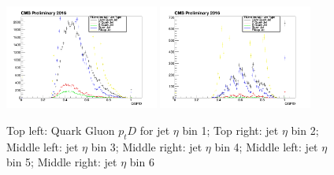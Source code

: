 \begin{figure}[htbp]
\begin{center}
  \includegraphics[width=0.45\textwidth]{sections/mc4/TopTagger/figures/_b_qgptdjetetabin4_.png}
  \includegraphics[width=0.45\textwidth]{sections/mc4/TopTagger/figures/_b_qgptdjetetabin5_.png}
 \end{center}
 \caption{Top left: Quark Gluon $p_{t}D$ for jet $\eta$ bin 1; Top right: jet $\eta$ bin 2; Middle left: jet $\eta$ bin 3; Middle right: jet $\eta$ bin 4; Middle left: jet $\eta$ bin 5; Middle right: jet $\eta$ bin 6}
 \label{fig:c4ttqgptdjeteta}
\end{figure}

